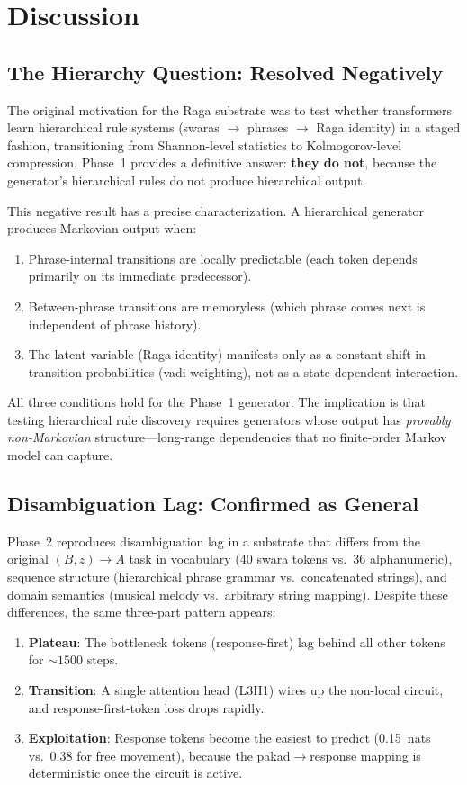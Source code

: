 \documentclass[11pt,a4paper]{article}
\begin{document}
\section{Discussion}

\subsection{The Hierarchy Question: Resolved Negatively}

The original motivation for the Raga substrate was to test whether transformers learn hierarchical rule systems (swaras $\to$ phrases $\to$ Raga identity) in a staged fashion, transitioning from Shannon-level statistics to Kolmogorov-level compression. Phase~1 provides a definitive answer: \textbf{they do not}, because the generator's hierarchical rules do not produce hierarchical output.

This negative result has a precise characterization. A hierarchical generator produces Markovian output when:
\begin{enumerate}[nosep]
    \item Phrase-internal transitions are locally predictable (each token depends primarily on its immediate predecessor).
    \item Between-phrase transitions are memoryless (which phrase comes next is independent of phrase history).
    \item The latent variable (Raga identity) manifests only as a constant shift in transition probabilities (vadi weighting), not as a state-dependent interaction.
\end{enumerate}

All three conditions hold for the Phase~1 generator. The implication is that testing hierarchical rule discovery requires generators whose output has \emph{provably non-Markovian} structure---long-range dependencies that no finite-order Markov model can capture.

\subsection{Disambiguation Lag: Confirmed as General}

Phase~2 reproduces disambiguation lag in a substrate that differs from the original $(B, z) \to A$ task in vocabulary (40 swara tokens vs.\ 36 alphanumeric), sequence structure (hierarchical phrase grammar vs.\ concatenated strings), and domain semantics (musical melody vs.\ arbitrary string mapping). Despite these differences, the same three-part pattern appears:
\begin{enumerate}[nosep]
    \item \textbf{Plateau}: The bottleneck tokens (response-first) lag behind all other tokens for ${\sim}1500$ steps.
    \item \textbf{Transition}: A single attention head (L3H1) wires up the non-local circuit, and response-first-token loss drops rapidly.
    \item \textbf{Exploitation}: Response tokens become the easiest to predict (0.15~nats vs.\ 0.38 for free movement), because the pakad$\to$response mapping is deterministic once the circuit is active.
\end{enumerate}
\end{document}
